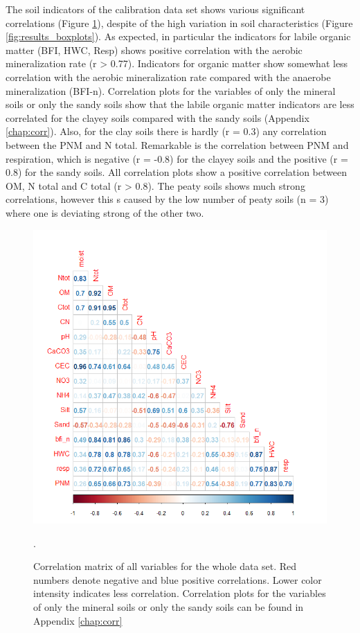 \documentclass[10pt,twoside,dutch,english]{report}
\begin{document}
The soil indicators of the calibration data set shows various significant correlations (Figure \ref{fig:results_corr}), despite of the high variation in soil characteristics (Figure \ref{fig:results_boxplots}). As expected, in particular the indicators for labile organic matter (BFI, HWC, Resp) shows positive correlation with the aerobic mineralization rate (r > 0.77). Indicators for organic matter show somewhat less correlation with the aerobic mineralization rate compared with the anaerobe mineralization (BFI-n). Correlation plots for the variables of  only the mineral soils or only the sandy soils  show that the labile organic matter indicators are less correlated for the clayey soils compared with the sandy soils  (Appendix \ref{chap:corr}). Also, for the clay soils there is hardly (r = 0.3) any correlation between the PNM and N total. Remarkable is the  correlation between PNM and respiration, which is negative (r = -0.8)  for the clayey soils and the positive (r = 0.8) for the sandy soils. All correlation plots show a positive correlation between OM, N total and C total (r > 0.8). The peaty soils shows much strong correlations, however this s caused by the low number of peaty soils (n = 3) where one is deviating strong of the other two. 
	\begin{figure}[h] %
	\centering
	\includegraphics[width=0.7\linewidth]{results_corr}
	\caption{Correlation matrix of all variables for the whole data set.  Red numbers denote negative and blue positive correlations. Lower color intensity indicates less correlation. Correlation plots for the variables of  only the mineral soils or only the sandy soils can be found in Appendix \ref{chap:corr}}.
	\label{fig:results_corr}
\end{figure}
\end{document}
